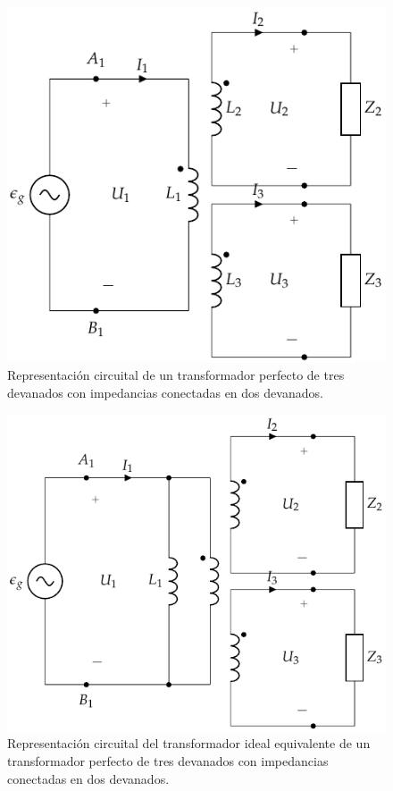\begin{figure}
  \centering
  \includegraphics[height=0.25\textheight]{../figs/TrafoPerfectoVariosDevanados_Impedancia.pdf}
  \caption{Representación circuital de un transformador perfecto de tres devanados con impedancias conectadas en dos devanados.}
  \label{fig:trafo-perfecto-varios-devanados-impedancia}
\end{figure}
\begin{figure}
  \centering
  \includegraphics[height=0.25\textheight]{../figs/TrafoPerfectoIdealVariosDevanados_Impedancia.pdf}
  \caption{Representación circuital del transformador ideal equivalente de un transformador perfecto de tres devanados con impedancias conectadas en dos devanados.}
  \label{fig:trafo-perfecto-ideal-varios-devanados-impedancia}
\end{figure}
